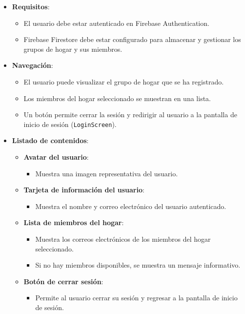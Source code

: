 \documentclass{article}
\begin{document}
\begin{flushleft}
\begin{itemize}
    \item \textbf{Requisitos}:
    \begin{itemize}
        \item El usuario debe estar autenticado en Firebase Authentication.
        \item Firebase Firestore debe estar configurado para almacenar y gestionar los grupos de hogar y sus miembros.
    \end{itemize}

    \item \textbf{Navegaci\'on}:
    \begin{itemize}
        \item El usuario puede visualizar el grupo de hogar que se ha registrado.
        \item Los miembros del hogar seleccionado se muestran en una lista.
        \item Un bot\'on permite cerrar la sesi\'on y redirigir al usuario a la pantalla de inicio de sesi\'on (\texttt{LoginScreen}).
    \end{itemize}

    \item \textbf{Listado de contenidos}:
    \begin{itemize}
        \item \textbf{Avatar del usuario}:
        \begin{itemize}
            \item Muestra una imagen representativa del usuario.
        \end{itemize}
        \item \textbf{Tarjeta de informaci\'on del usuario}:
        \begin{itemize}
            \item Muestra el nombre y correo electr\'onico del usuario autenticado.
        \end{itemize}
        
        \item \textbf{Lista de miembros del hogar}:
        \begin{itemize}
            \item Muestra los correos electr\'onicos de los miembros del hogar seleccionado.
            \item Si no hay miembros disponibles, se muestra un mensaje informativo.
        \end{itemize}
        \item \textbf{Bot\'on de cerrar sesi\'on}:
        \begin{itemize}
            \item Permite al usuario cerrar su sesi\'on y regresar a la pantalla de inicio de sesi\'on.
        \end{itemize}
    \end{itemize}


\end{itemize}
\end{flushleft}
\end{document}
